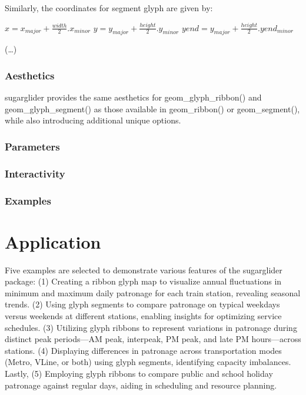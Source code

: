 Similarly, the coordinates for segment glyph are given by:

\(x = x_{major} + \frac{width}{2}.x_{minor}\)
\(y = y_{major} + \frac{height}{2}.y_{minor}\)
\(yend = y_{major} + \frac{height}{2}.yend_{minor}\)

(\ldots)

\hypertarget{aesthetics}{%
\subsubsection{Aesthetics}\label{aesthetics}}

sugarglider provides the same aesthetics for geom\_glyph\_ribbon() and geom\_glyph\_segment() as those available in geom\_ribbon() or geom\_segment(), while also introducing additional unique options.

\hypertarget{parameters}{%
\subsubsection{Parameters}\label{parameters}}

\hypertarget{interactivity}{%
\subsubsection{Interactivity}\label{interactivity}}

\hypertarget{examples}{%
\subsubsection{Examples}\label{examples}}

\hypertarget{application}{%
\section{Application}\label{application}}

Five examples are selected to demonstrate various features of the sugarglider package: (1) Creating a ribbon glyph map to visualize annual fluctuations in minimum and maximum daily patronage for each train station, revealing seasonal trends. (2) Using glyph segments to compare patronage on typical weekdays versus weekends at different stations, enabling insights for optimizing service schedules. (3) Utilizing glyph ribbons to represent variations in patronage during distinct peak periods---AM peak, interpeak, PM peak, and late PM hours---across stations. (4) Displaying differences in patronage across transportation modes (Metro, VLine, or both) using glyph segments, identifying capacity imbalances. Lastly, (5) Employing glyph ribbons to compare public and school holiday patronage against regular days, aiding in scheduling and resource planning.


